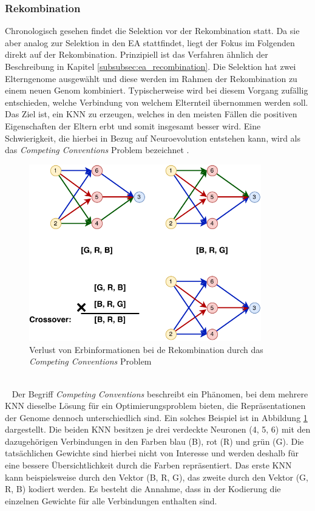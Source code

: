 \subsubsection{Rekombination}
\label{subsubsec:recombination}
Chronologisch gesehen findet die Selektion vor der Rekombination statt. Da sie aber analog zur Selektion in den \ac{EA} stattfindet, liegt der Fokus im Folgenden direkt auf der Rekombination. Prinzipiell ist das Verfahren ähnlich der Beschreibung in Kapitel \ref{subsubsec:ea_recombination}. Die Selektion hat zwei Elterngenome ausgewählt und diese werden im Rahmen der Rekombination zu einem neuen Genom kombiniert. Typischerweise wird bei diesem Vorgang zufällig entschieden, welche Verbindung von welchem Elternteil übernommen werden soll. Das Ziel ist, ein \ac{KNN} zu erzeugen, welches in den meisten Fällen die positiven Eigenschaften der Eltern erbt und somit insgesamt besser wird. Eine Schwierigkeit, die hierbei in Bezug auf Neuroevolution entstehen kann, wird als das \emph{Competing Conventions} Problem bezeichnet \cite{stanley2002evolving}.
\begin{figure}[h]
	\centering
	\includegraphics[width=0.9\textwidth]{./img/ea_basics/neat-CompetingConventions.pdf} 
	\caption{Verlust von Erbinformationen bei de Rekombination durch das \emph{Competing Conventions} Problem}
	\label{fig:competing_convenvtions}
\end{figure}
\\\ \noindent
Der Begriff \emph{Competing Conventions} beschreibt ein Phänomen, bei dem mehrere \ac{KNN} dieselbe Lösung für ein Optimierungsproblem bieten, die Repräsentationen der Genome dennoch unterschiedlich sind. Ein solches Beispiel ist in Abbildung \ref{fig:competing_convenvtions} dargestellt. Die beiden \ac{KNN} besitzen je drei verdeckte Neuronen (4, 5, 6) mit den dazugehörigen Verbindungen in den Farben blau (B), rot (R) und grün (G). Die tatsächlichen Gewichte sind hierbei nicht von Interesse und werden deshalb für eine bessere Übersichtlichkeit durch die Farben repräsentiert. Das erste \ac{KNN} kann beispielsweise durch den Vektor (B, R, G), das zweite durch den Vektor  (G, R, B) kodiert werden. Es besteht die Annahme, dass in der Kodierung die einzelnen Gewichte für alle Verbindungen enthalten sind. \\\\
